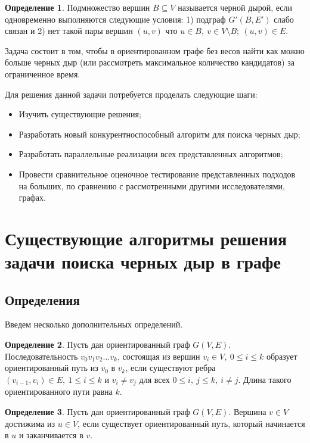 \documentclass[12pt,a4paper,oneside,openany]{article}
\theoremstyle{definition}
\newtheorem{definition}{Определение}[]
\theoremstyle{lemma}
\theoremstyle{remark}
\begin{document}
\begin{definition}\label{def:blackhole}
Подмножество вершин $B \subseteq V$ называется черной дырой, если одновременно выполняются следующие условия:
1) подграф $G'(B,E')$ слабо связан и 2) нет такой пары вершин $(u,v)$ что $u \in B,\ v \in V\setminus{B};\ (u,v) \in E$.
\end{definition}

Задача состоит в том, чтобы в ориентированном графе без весов найти как можно больше черных дыр (или рассмотреть максимальное количество кандидатов) за ограниченное время.

Для решения данной задачи потребуется проделать следующие шаги:
\begin{itemize}
    \item Изучить существующие решения;
    \item Разработать новый конкурентноспособный алгоритм для поиска черных дыр;
    \item Разработать параллельные реализации всех представленных алгоритмов;
    \item Провести сравнительное оценочное тестирование представленных подходов на больших, по сравнению с рассмотренными другими исследователями, графах.
\end{itemize}

\cleardoublepage

\section{Существующие алгоритмы решения задачи поиска черных дыр в графе}\label{sec:prevsolutions}

\subsection{Определения}\label{sec:definitions}

Введем несколько дополнительных определений.

\begin{definition}\label{def:orpath}
	Пусть дан ориентированный граф $G(V,E)$. Последовательность $v_0v_1v_2...v_k$, состоящая из вершин $v_i \in V,\ 0 \leq i \leq k$ образует ориентированный путь из $v_0$ в $v_k$, если существуют ребра $(v_{i-1}, v_i) \in E,\ 1 \leq i \leq k$ и $v_i \neq v_j$ для всех $0 \leq i,\ j \leq k,\ i \neq j$. Длина такого ориентированного пути равна $k$.
\end{definition}

\begin{definition}\label{def:reachablevertex}
	Пусть дан ориентированный граф $G(V,E)$. Вершина $v \in V$ достижима из $u \in V$, если существует ориентированный путь, который начинается в $u$ и заканчивается в $v$.
\end{definition}
\end{document}
